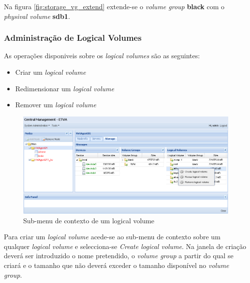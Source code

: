 Na figura \ref{fig:storage_vg_extend} extende-se o \emph{volume group} {\bf black} com o \emph{physival volume} {\bf sdb1}.


\subsubsection{Administração de Logical Volumes}

As operações disponiveis sobre os \emph{logical volumes} são as seguintes:
\begin{itemize}
	\item Criar um \emph{logical volume}
	\item Redimensionar um \emph{logical volume}
	\item Remover um \emph{logical volume}
\end{itemize}

\begin{figure}[H]
        \begin{center}
        \includegraphics[scale=0.5]{screenshots/node_storage_lv_ctx.png}
        \caption{Sub-menu de contexto de um logical volume}
        \label{fig:storage_lv_ctx}
        \end{center}
\end{figure}

Para criar um \emph{logical volume} acede-se ao sub-menu de contexto sobre um qualquer \emph{logical volume} e selecciona-se \emph{Create logical volume}.
Na janela de criação deverá ser introduzido o nome pretendido, o \emph{volume group} a partir do qual se criará e o tamanho que não deverá exceder o tamanho disponível no \emph{volume group}.

